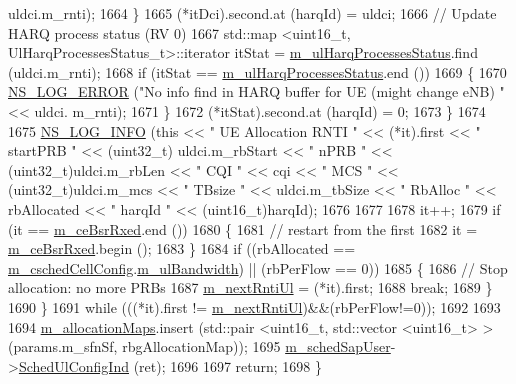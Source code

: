 \begin{DoxyCode}
      uldci.m\_rnti);
1664             \}
1665           (*itDci).second.at (harqId) = uldci;
1666           \textcolor{comment}{// Update HARQ process status (RV 0)}
1667           std::map <uint16\_t, UlHarqProcessesStatus\_t>::iterator itStat = 
      \hyperlink{classns3_1_1TdMtFfMacScheduler_a0a4599be9db713d937b6d524a8546f19}{m\_ulHarqProcessesStatus}.find (uldci.m\_rnti);
1668           \textcolor{keywordflow}{if} (itStat == \hyperlink{classns3_1_1TdMtFfMacScheduler_a0a4599be9db713d937b6d524a8546f19}{m\_ulHarqProcessesStatus}.end ())
1669             \{
1670               \hyperlink{group__logging_ga0261a8db1d4ac5f79417d117634fd455}{NS\_LOG\_ERROR} (\textcolor{stringliteral}{"No info find in HARQ buffer for UE (might change eNB) "} << uldci.
      m\_rnti);
1671             \}
1672           (*itStat).second.at (harqId) = 0;
1673         \}
1674 
1675       \hyperlink{group__logging_gafbd73ee2cf9f26b319f49086d8e860fb}{NS\_LOG\_INFO} (\textcolor{keyword}{this} << \textcolor{stringliteral}{" UE Allocation RNTI "} << (*it).first << \textcolor{stringliteral}{" startPRB "} << (uint32\_t)
      uldci.m\_rbStart << \textcolor{stringliteral}{" nPRB "} << (uint32\_t)uldci.m\_rbLen << \textcolor{stringliteral}{" CQI "} << cqi << \textcolor{stringliteral}{" MCS "} << (uint32\_t)uldci.m\_mcs 
      << \textcolor{stringliteral}{" TBsize "} << uldci.m\_tbSize << \textcolor{stringliteral}{" RbAlloc "} << rbAllocated << \textcolor{stringliteral}{" harqId "} << (uint16\_t)harqId);
1676 
1677 
1678       it++;
1679       \textcolor{keywordflow}{if} (it == \hyperlink{classns3_1_1TdMtFfMacScheduler_a06bec792095027e46fcf5281e4f4e77a}{m\_ceBsrRxed}.end ())
1680         \{
1681           \textcolor{comment}{// restart from the first}
1682           it = \hyperlink{classns3_1_1TdMtFfMacScheduler_a06bec792095027e46fcf5281e4f4e77a}{m\_ceBsrRxed}.begin ();
1683         \}
1684       \textcolor{keywordflow}{if} ((rbAllocated == \hyperlink{classns3_1_1TdMtFfMacScheduler_a585412f686e33f49dad1003e5d2216f0}{m\_cschedCellConfig}.\hyperlink{structns3_1_1FfMacCschedSapProvider_1_1CschedCellConfigReqParameters_a5ab5b102878e6e7e7727a14af4a64d2f}{m\_ulBandwidth}) || (rbPerFlow ==
       0))
1685         \{
1686           \textcolor{comment}{// Stop allocation: no more PRBs}
1687           \hyperlink{classns3_1_1TdMtFfMacScheduler_afc4fae2138add1ae9e42970e93046f52}{m\_nextRntiUl} = (*it).first;
1688           \textcolor{keywordflow}{break};
1689         \}
1690     \}
1691   \textcolor{keywordflow}{while} (((*it).first != \hyperlink{classns3_1_1TdMtFfMacScheduler_afc4fae2138add1ae9e42970e93046f52}{m\_nextRntiUl})&&(rbPerFlow!=0));
1692 
1693 
1694   \hyperlink{classns3_1_1TdMtFfMacScheduler_a08ce126c31d6c975542dfa7038bd27c8}{m\_allocationMaps}.insert (std::pair <uint16\_t, std::vector <uint16\_t> > (params.m\_sfnSf, 
      rbgAllocationMap));
1695   \hyperlink{classns3_1_1TdMtFfMacScheduler_a2e3ce0452adef9b30cce73ac31c93ef4}{m\_schedSapUser}->\hyperlink{classns3_1_1FfMacSchedSapUser_a1b89636256701a84d990db7db8aea874}{SchedUlConfigInd} (ret);
1696 
1697   \textcolor{keywordflow}{return};
1698 \}
\end{DoxyCode}


